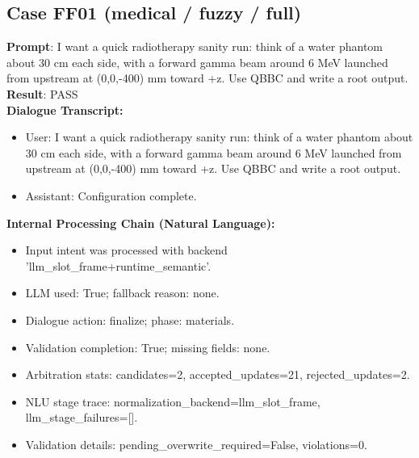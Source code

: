 \documentclass[11pt]{ctexart}
\begin{document}
\subsection{Case FF01 (medical / fuzzy / full)}
\textbf{Prompt}: I want a quick radiotherapy sanity run: think of a water phantom about 30 cm each side, with a forward gamma beam around 6 MeV launched from upstream at (0,0,-400) mm toward +z. Use QBBC and write a root output.\\
\textbf{Result}: PASS\\
\textbf{Dialogue Transcript:}
\begin{itemize}
\item User: I want a quick radiotherapy sanity run: think of a water phantom about 30 cm each side, with a forward gamma beam around 6 MeV launched from upstream at (0,0,-400) mm toward +z. Use QBBC and write a root output.
\item Assistant: Configuration complete.
\end{itemize}
\textbf{Internal Processing Chain (Natural Language):}
\begin{itemize}
\item Input intent was processed with backend 'llm\_slot\_frame+runtime\_semantic'.
\item LLM used: True; fallback reason: none.
\item Dialogue action: finalize; phase: materials.
\item Validation completion: True; missing fields: none.
\item Arbitration stats: candidates=2, accepted\_updates=21, rejected\_updates=2.
\item NLU stage trace: normalization\_backend=llm\_slot\_frame, llm\_stage\_failures=[].
\item Validation details: pending\_overwrite\_required=False, violations=0.
\end{itemize}
\end{document}
